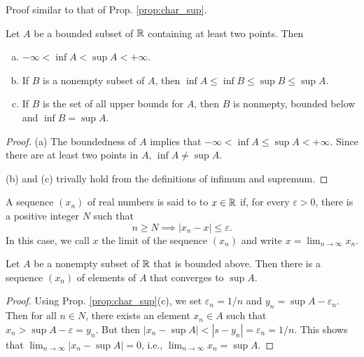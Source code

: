 \documentclass[11pt,a4paper]{article}
\begin{document}
\noindent Proof similar to that of Prop. \ref{prop:char_sup}.

\begin{proposition}
    Let $A$ be a bounded subset of $\mathbb{R}$ containing at least two points. Then
    \begin{enumerate}[(a)]
        \item $-\infty<\inf A<\sup A<+\infty$.
        \item If $B$ is a nonempty subset of $A$, then $\inf A\le \inf B\le\sup B\le \sup A$.
        \item If $B$ is the set of all upper bounds for $A$, then $B$ is nonmepty, bounded below and $\inf B = \sup A$.
    \end{enumerate}
\end{proposition}

\begin{proof}
    (a) The boundedness of $A$ implies that $-\infty < \inf A\le \sup A<+\infty$. Since there are at least two points in $A$, $\inf A\neq \sup A$.

    \noindent (b) and (c) trivally hold from the definitions of infimum and supremum.
\end{proof}

\begin{definition}
    A sequence $(x_n)$ of real numbers is said to  to $x\in \mathbb{R}$ if, for every $\varepsilon>0$, there is a positive integer $N$ such that 
    \begin{equation*}
        n\ge N \implies |x_n-x|\le \varepsilon.
    \end{equation*}
    In this case, we call $x$ the limit of the sequence $(x_n)$ and write $x = \lim_{n\rightarrow \infty} x_n$.
\end{definition}

\begin{proposition}
    Let $A$ be a nonempty subset of $\mathbb{R}$ that is bounded above. Then there is a sequence $(x_n)$ of elements of $A$ that converges to $\sup A$.
\end{proposition}

\begin{proof}
    Using Prop. \ref{prop:char_sup}(c), we set $\varepsilon_n = 1/n$ and $y_n = \sup A-\varepsilon_n$. Then for all $n\in N$, there exists an element $x_n\in A$ such that $x_n>\sup A -\varepsilon = y_n$. But then $|x_n-\sup A|<|s-y_n| = \varepsilon_n = 1/n$. This shows that $\lim_{n\rightarrow \infty} |x_n-\sup A| = 0$, i.e., $\lim_{n\rightarrow \infty} x_n = \sup A$.
\end{proof}
\end{document}
